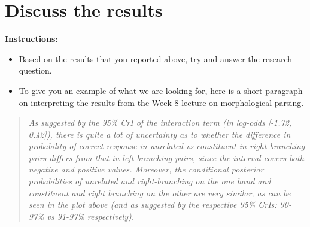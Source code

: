 \documentclass[
]{article}
\providecommand{\tightlist}{%
  \setlength{\itemsep}{0pt}\setlength{\parskip}{0pt}}
\begin{document}
\section{Discuss the results}\label{discuss-the-results}

\textbf{Instructions}:

\begin{itemize}
\tightlist
\item
  Based on the results that you reported above, try and answer the
  research question.
\item
  To give you an example of what we are looking for, here is a short
  paragraph on interpreting the results from the Week 8 lecture on
  morphological parsing.
\end{itemize}

\begin{quote}
\emph{As suggested by the 95\% CrI of the interaction term (in log-odds
{[}-1.72, 0.42{]}), there is quite a lot of uncertainty as to whether
the difference in probability of correct response in unrelated vs
constituent in right-branching pairs differs from that in left-branching
pairs, since the interval covers both negative and positive values.
Moreover, the conditional posterior probabilities of unrelated and
right-branching on the one hand and constituent and right branching on
the other are very similar, as can be seen in the plot above (and as
suggested by the respective 95\% CrIs: 90-97\% vs 91-97\%
respectively).}
\end{quote}
\end{document}
